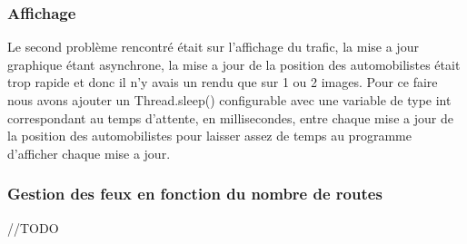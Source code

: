 \documentclass[12pt]{article}
\begin{document}
			\subsubsection{Affichage}
				Le second problème rencontré était sur l'affichage du trafic, la mise a jour graphique étant asynchrone, la mise a jour de la position des automobilistes était trop rapide et donc il n'y avais un rendu que sur 1 ou 2 images. Pour ce faire nous avons ajouter un Thread.sleep() configurable avec une variable de type int correspondant au temps d'attente, en millisecondes,  entre chaque mise a jour de la position des automobilistes pour laisser assez de temps au programme d'afficher chaque mise a jour.
			\subsubsection{Gestion des feux en fonction du nombre de routes}
				//TODO
				
\end{document}

